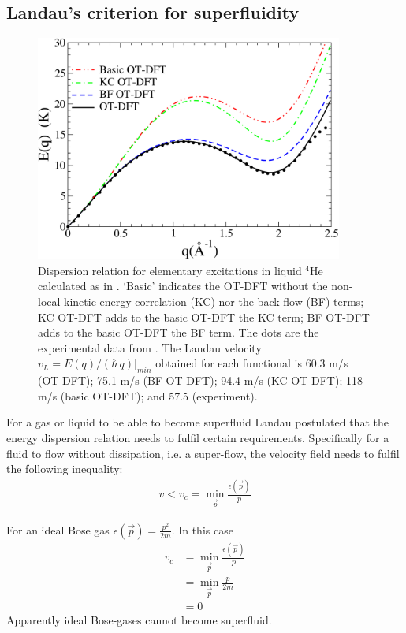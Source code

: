 		\subsection{Landau's criterion for superfluidity}
			\begin{figure}[t]
				\begin{center}
					\includegraphics[width=0.9\textwidth]{dispersion-relation}
					\caption{Dispersion relation for elementary excitations in liquid $^4$He calculated as in  \cite{Mat10a}. `Basic' indicates the OT-DFT without the non-local kinetic energy correlation (KC) nor the back-flow (BF) terms; KC OT-DFT adds  to the basic OT-DFT the KC term; BF OT-DFT adds to the basic OT-DFT the BF term. The dots are the experimental data from \cite{Don81}. The Landau velocity $v_L = E(q)/(\hbar\,q)|_{min}$ obtained for each functional is  60.3 m/s (OT-DFT); 75.1 m/s (BF OT-DFT); 94.4 m/s (KC OT-DFT); 118 m/s (basic OT-DFT); and 57.5 (experiment).}
					\label{fig:dispersion-relation}
				\end{center}
			\end{figure}
		
			For a gas or liquid to be able to become superfluid Landau postulated that the energy dispersion relation needs to fulfil certain requirements. Specifically for a fluid to flow  without dissipation, i.e. a super-flow, the velocity field needs to fulfil the following inequality:
			\begin{align}
				v<v_c = \min_{\vec{p}}\frac{\epsilon(\vec{p})}{p}
			\end{align}
			
			For an ideal Bose gas $\epsilon(\vec{p})= \frac{p^2}{2m}$. In this case 
			\begin{align}
				v_c &= \min_{\vec{p}}\frac{\epsilon(\vec{p})}{p} \\
					&= \min_{\vec{p}}\frac{p}{2m} \\
					&= 0
			\end{align}
			Apparently ideal Bose-gases cannot become superfluid.\\
			
